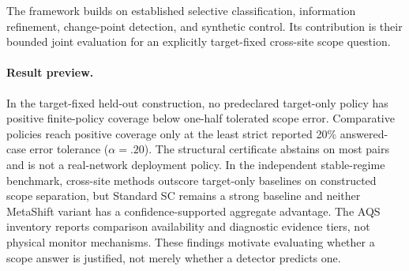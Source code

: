 The framework builds on established selective classification, information
refinement, change-point detection, and synthetic control. Its contribution is
their bounded joint evaluation for an explicitly target-fixed cross-site scope
question.

\paragraph{Result preview.}
In the target-fixed held-out construction, no predeclared target-only policy
has positive finite-policy coverage below one-half tolerated scope error.
Comparative policies reach positive coverage only at the least strict reported
20\% answered-case error tolerance ($\alpha=.20$). The structural certificate
abstains on most pairs and is not a real-network deployment policy. In the
independent stable-regime
benchmark, cross-site methods outscore target-only baselines on constructed
scope separation, but Standard SC remains a strong baseline and neither
MetaShift variant has a confidence-supported aggregate advantage. The AQS
inventory reports comparison availability and diagnostic evidence tiers, not
physical monitor mechanisms. These findings motivate evaluating whether a scope
answer is justified, not merely whether a detector predicts one.

\FloatBarrier
